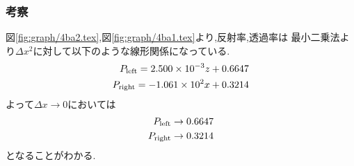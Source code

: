 \subsubsection*{考察}
図\ref{fig:graph/4ba2.tex},図\ref{fig:graph/4ba1.tex}より,反射率,透過率は
最小二乗法より$\Delta x^2$に対して以下のような線形関係になっている.
\begin{align}
  P_{\rm left}=2.500\times10^{-3}z+0.6647\\
  P_{\rm right}=-1.061\times 10^2x+0.3214
\end{align}
よって$\Delta x\rightarrow 0$においては
\begin{align}
  P_{\rm left}\rightarrow 0.6647\\
  P_{\rm right}\rightarrow 0.3214
\end{align}
となることがわかる.